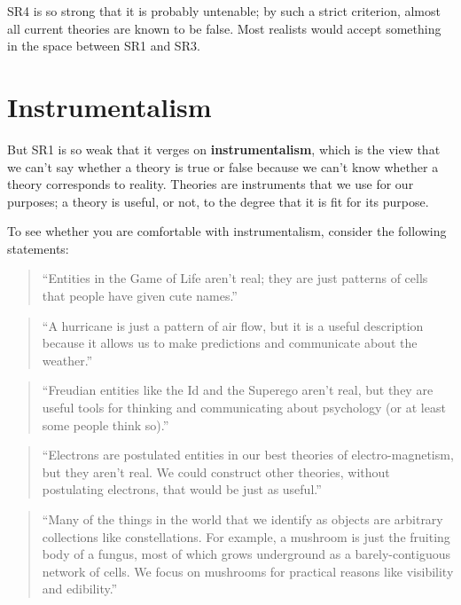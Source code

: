 \documentclass[10pt]{book}
\begin{document}
SR4 is so strong that it is probably untenable; by such a strict
criterion, almost all current theories are known to be false.  
Most realists would accept something in the space
between SR1 and SR3.


\section{Instrumentalism}

But SR1 is so weak that it verges on {\bf instrumentalism}, which is
the view that we can't say whether a theory is true or false because
we can't know whether a theory corresponds to reality.  Theories are
instruments that we use for our purposes; a theory is useful, or not,
to the degree that it is fit for its purpose.

To see whether you are comfortable with instrumentalism, consider
the following statements:

\begin{quote}
``Entities in the Game of Life aren't real; they are just patterns of
  cells that people have given cute names.''
\end{quote}

\begin{quote}
``A hurricane is just a pattern of air flow, but it is a useful
  description because it allows us to make predictions and communicate
  about the weather.''
\end{quote}

\begin{quote}
``Freudian entities like the Id and the Superego aren't real, but they
  are useful tools for thinking and communicating about psychology (or
  at least some people think so).''
\end{quote}

\begin{quote}
``Electrons are postulated entities in our best theories of
electro-magnetism, but they aren't real.  We could construct
other theories, without postulating electrons, that would be
just as useful.''
\end{quote}

\begin{quote}
``Many of the things in the world that we identify as objects are
  arbitrary collections like constellations.  For example, a mushroom
  is just the fruiting body of a fungus, most of which grows
  underground as a barely-contiguous network of cells.  We focus
  on mushrooms for practical reasons like visibility and edibility.''
\end{quote}
\end{document}
